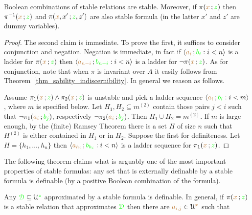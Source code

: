 
\begin{lemma}\label{lem_stab_Boole}
  Boolean combinations of stable relations are stable.
  Moreover, if $\pi({\color{brown} x}\,;{\color{green} z})$ then  $\pi^{-1}({\color{brown} x}\,;{\color{green} z})$ and $\pi({\color{brown} x},x'\,;{\color{green} z},z')$ are also stable formula (in the latter $x'$ and $z'$ are dummy variables).
\end{lemma}

\begin{proof}
  The second claim is immediate.
  To prove the first, it suffices to consider conjunction and negation.
  Negation is immediate, in fact if $\langle{\color{brown}a_i}\,;{\color{green} b_i} : i<n\rangle$ is a ladder for $\pi({\color{brown} x}\,;{\color{green} z})$ then $\langle{\color{brown}a_{n-i}}\,;{\color{green} b_{n-i}} : i<n\rangle$ is a ladder for $\neg\pi({\color{brown} x}\,;{\color{green} z})$.
  As for conjunction, note that when $\pi$ is invariant over $A$ it easily follows from Theorem~\ref{thm_sability_indiscernibility}.
  In general we reason as follows.

  Assume $\pi_1({\color{brown} x}\,;{\color{green} z})\wedge\pi_2({\color{brown} x}\,;{\color{green} z})$ is unstable and pick a ladder sequence $\langle{\color{brown}a_i}\,;{\color{green} b_i} : i<m\rangle$, where $m$ is specified below.
  Let $H_1,H_2\subseteq m^{(2)}$ contain those pairs $j<i$ such that $\neg\pi_1({\color{brown} a_i}\,;{\color{green} b_j})$, respectively $\neg\pi_2({\color{brown} a_i}\,;{\color{green} b_j})$. 
  Then $H_1\cup H_2= m^{(2)}$. 
  If $m$ is large enough, by the (finite) Ramsey Theorem there is a set $H$ of size $n$ such that $H^{(2)}$ is either contained in $H_1$ or in $H_2$. Suppose the first for definiteness. 
  Let $H=\{h_1,\dots,h_n\}$ then $\langle{\color{brown}a_{h_i}}\,;{\color{green} b_{h_i}} : i<n\rangle$ is a ladder sequence for $\pi_1({\color{brown} x}\,;{\color{green} z})$.
\end{proof}

The following theorem claims what is arguably one of the most important properties of stable formulas: any set that is externally definable by a stable formula is definable (by a positive Boolean combination of the formula).

\begin{theorem}\label{thm_def_stable_formula}
Any ${\color{green}\EuScript D}\subseteq\EuScript U^{\color{green} z}$ approximated by a stable formula is definable.
In general, if $\pi({\color{brown} x}\,;{\color{green} z})$ is a stable relation that approximates ${\color{green}\EuScript D}$ then there are ${\color{brown} a_{i,j}}\in\EuScript U^{\color{brown} x}$ such that

\end{theorem}

